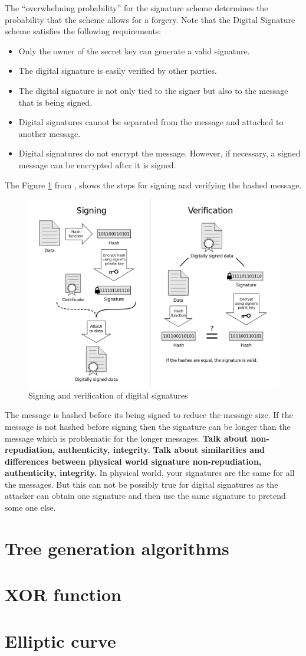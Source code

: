 	The ``overwhelming probability'' for the signature scheme determines the probability that the scheme allows for a forgery.
	Note that the Digital Signature scheme satisfies the following requirements:
		\begin{itemize}
			\item Only the owner of the secret key can generate a valid signature.
			\item The digital signature is easily verified by other parties.
			\item The digital signature is not only tied to the signer but also to the message that is being signed.
			\item Digital signatures cannot be separated from the message and attached to another message.
			\item Digital signatures do not encrypt the message. However, if necessary, a signed message can be encrypted after it is signed.
		\end{itemize}
	The Figure \ref{fig:digita-signature} from \cite{DigitalSignature}, shows the steps for signing and verifying the hashed message. 
	\begin{figure}[h!]
		\centering
		\includegraphics[scale = 0.4]{images/Digital_Signature_diagram.png}
		\caption{ Signing and verification of digital signatures}
		\label{fig:digita-signature}
	\end{figure}
	The message is hashed before its being signed to reduce the message size. 
	If the message is not hashed before signing then the signature can be longer than the message which is problematic for the longer messages.
	\textbf{Talk about non-repudiation, authenticity, integrity.}
	\textbf{Talk about similarities and differences between physical world signature non-repudiation, authenticity, integrity.}
	In physical world, your signatures are the same for all the messages. 
	But this can not be possibly true for digital signatures as the attacker can obtain one signature and then use the same signature to pretend some one else.

\section {Tree generation algorithms}

\section{XOR function}

\section{Elliptic curve}
